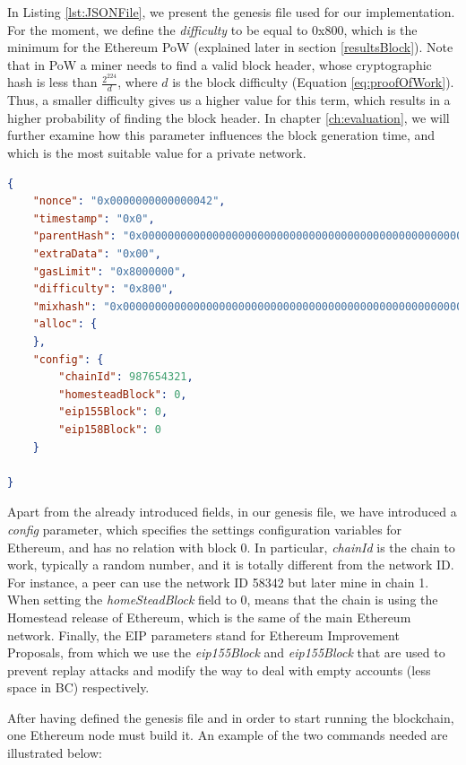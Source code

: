 In Listing \ref{lst:JSONFile}, we present the genesis file used for our implementation. For the moment, we define the \textit{difficulty} to be equal to 0x800, which is the minimum for the Ethereum PoW (explained later in section \ref{resultsBlock}). Note that in PoW a miner needs to find a valid block header, whose cryptographic hash is less than $\frac{2^{224}}{d}$, where $d$ is the block difficulty (Equation \ref{eq:proofOfWork}). Thus, a smaller difficulty gives us a higher value for this term, which results in a higher probability of finding the block header. In chapter \ref{ch:evaluation}, we will further examine how this parameter influences the block generation time, and which is the most suitable value for a private network. 
\newline

\begin{lstlisting}[language=JSON,caption={Genesis file used for our implementation.},label={lst:JSONFile}]
{
    "nonce": "0x0000000000000042",
    "timestamp": "0x0",
    "parentHash": "0x0000000000000000000000000000000000000000000000000000000000000000",
    "extraData": "0x00",
    "gasLimit": "0x8000000",
    "difficulty": "0x800",
    "mixhash": "0x0000000000000000000000000000000000000000000000000000000000000000",
    "alloc": {
    },
    "config": {
        "chainId": 987654321,
        "homesteadBlock": 0,
        "eip155Block": 0,
        "eip158Block": 0
    } 

}
\end{lstlisting}

Apart from the already introduced fields, in our genesis file, we have introduced a \textit{config} parameter, which specifies the settings configuration variables for Ethereum, and has no relation with block 0. In particular, \textit{chainId} is the chain to work, typically a random number, and it is totally different from the network ID. For instance, a peer can use the network ID 58342 but later mine in chain 1. When setting the \textit{homeSteadBlock} field to 0, means that the chain is using the Homestead release of Ethereum, which is the same of the main Ethereum network. Finally, the EIP parameters stand for Ethereum Improvement Proposals, from which we use the \textit{eip155Block} and \textit{eip155Block} that are used to prevent replay attacks and modify the way to deal with empty accounts (less space in BC) respectively.

After having defined the genesis file and in order to start running the blockchain, one Ethereum node must build it. An example of the two commands needed are illustrated below:
\newline

